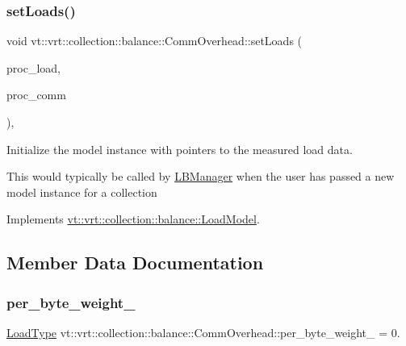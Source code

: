 \subsubsection{\texorpdfstring{set\+Loads()}{setLoads()}}
{\footnotesize\ttfamily void vt\+::vrt\+::collection\+::balance\+::\+Comm\+Overhead\+::set\+Loads (\begin{DoxyParamCaption}\item[{std\+::unordered\+\_\+map$<$ \hyperlink{namespacevt_a46ce6733d5cdbd735d561b7b4029f6d7}{Phase\+Type}, \hyperlink{namespacevt_1_1vrt_1_1collection_1_1balance_a5339303db2e1ce964d783a53fd74e6b1}{Load\+Map\+Type} $>$ const $\ast$}]{proc\+\_\+load,  }\item[{std\+::unordered\+\_\+map$<$ \hyperlink{namespacevt_a46ce6733d5cdbd735d561b7b4029f6d7}{Phase\+Type}, \hyperlink{namespacevt_1_1vrt_1_1collection_1_1balance_a01ee1fb0ae2da1d2ab7fdca3be9ae351}{Comm\+Map\+Type} $>$ const $\ast$}]{proc\+\_\+comm }\end{DoxyParamCaption})\hspace{0.3cm}{\ttfamily [override]}, {\ttfamily [virtual]}}



Initialize the model instance with pointers to the measured load data. 

This would typically be called by \hyperlink{structvt_1_1vrt_1_1collection_1_1balance_1_1_l_b_manager}{L\+B\+Manager} when the user has passed a new model instance for a collection 

Implements \hyperlink{structvt_1_1vrt_1_1collection_1_1balance_1_1_load_model_a07512b8d95025a21a7c25cc3fdb817ad}{vt\+::vrt\+::collection\+::balance\+::\+Load\+Model}.



\subsection{Member Data Documentation}
\mbox{\label{structvt_1_1vrt_1_1collection_1_1balance_1_1_comm_overhead_a7ea82599681be029e50f056d391bd739}} 
\subsubsection{\texorpdfstring{per\+\_\+byte\+\_\+weight\+\_\+}{per\_byte\_weight\_}}
{\footnotesize\ttfamily \hyperlink{namespacevt_a8fb51741340b87d7aaee0bef60e9896b}{Load\+Type} vt\+::vrt\+::collection\+::balance\+::\+Comm\+Overhead\+::per\+\_\+byte\+\_\+weight\+\_\+ = 0.\hspace{0.3cm}{\ttfamily [private]}}

